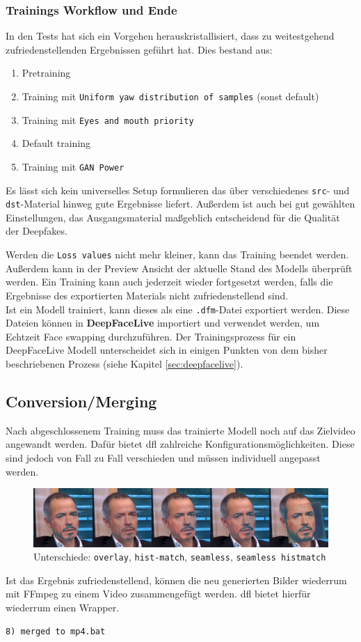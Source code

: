 \subsubsection*{Trainings Workflow und Ende}
In den Tests hat sich ein Vorgehen herauskristallisiert, dass zu weitestgehend zufriedenstellenden Ergebnissen geführt hat.
Dies bestand aus:
\begin{enumerate}
    \item Pretraining
    \item Training mit \texttt{Uniform yaw distribution of samples} (sonst default)
    \item Training mit \texttt{Eyes and mouth priority}
    \item Default training
    \item Training mit \texttt{GAN Power}
\end{enumerate}
Es lässt sich kein universelles Setup formulieren das über verschiedenes \texttt{src}- und \texttt{dst}-Material hinweg gute Ergebnisse liefert.
Außerdem ist auch bei gut gewählten Einstellungen, das Ausgangsmaterial maßgeblich entscheidend für die Qualität der Deepfakes.

Werden die \texttt{Loss values} nicht mehr kleiner, kann das Training beendet werden.
Außerdem kann in der Preview Ansicht der aktuelle Stand des Modells überprüft werden.
Ein Training kann auch jederzeit wieder fortgesetzt werden, falls die Ergebnisse des exportierten Materials nicht zufriedenstellend sind.\\

Ist ein Modell trainiert, kann dieses als eine \texttt{.dfm}-Datei exportiert werden.
Diese Dateien können in \textbf{DeepFaceLive} importiert und verwendet werden, um Echtzeit Face swapping durchzuführen.
Der Trainingsprozess für ein DeepFaceLive Modell unterscheidet sich in einigen Punkten von dem bisher beschriebenen Prozess (siehe Kapitel \ref{sec:deepfacelive}).

\subsection*{Conversion/Merging}
Nach abgeschlossenem Training muss das trainierte Modell noch auf das Zielvideo angewandt werden.
Dafür bietet \gls{dfl} zahlreiche Konfigurationsmöglichkeiten.
Diese sind jedoch von Fall zu Fall verschieden und müssen individuell angepasst werden.
\begin{figure}
    \center
    \includegraphics[width=\textwidth]{Bilder/DFL/merger-comparison}
    \caption{Unterschiede: \texttt{overlay}, \texttt{hist-match}, \texttt{seamless}, \texttt{seamless histmatch}}
    \label{fig:merger-comparison}
\end{figure}

Ist das Ergebnis zufriedenstellend, können die neu generierten Bilder wiederrum mit FFmpeg zu einem Video zusammengefügt werden.
\gls{dfl} bietet hierfür wiederrum einen Wrapper.
\begin{lstlisting}[numbers=none,label={lst:merged-to-mp4}]
    8) merged to mp4.bat
\end{lstlisting}